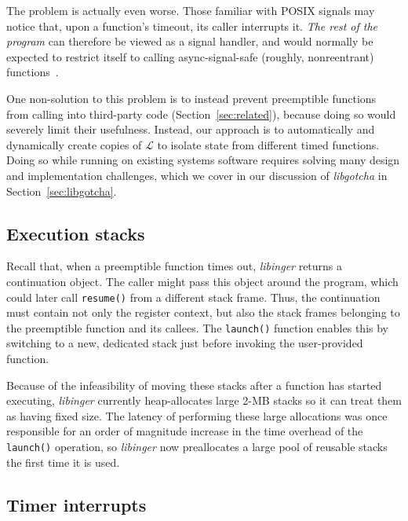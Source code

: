 The problem is actually even worse.  Those familiar with POSIX signals may notice
that, upon a function's timeout, its caller interrupts it.  \textit{The rest of the
program} can therefore be viewed as a signal handler, and would normally be expected
to restrict itself to calling async-signal-safe (roughly, nonreentrant)
functions~\cite{signal-safety-manpage}.

One non-solution to this problem is to instead prevent preemptible functions from
calling into third-party code (Section~\ref{sec:related}), because doing so would
severely limit their usefulness.  Instead, our approach
is to automatically and dynamically create copies of $\mathcal{L}$ to
isolate state from different timed functions. Doing so while running on
existing systems software requires solving many
design and implementation challenges, which we cover in our discussion of
\textit{libgotcha} in Section~\ref{sec:libgotcha}.



\subsection{Execution stacks}

Recall that, when a preemptible function times out, \textit{libinger} returns a
continuation object.  The caller might pass this object around the program, which
could later call \texttt{resume()} from a different stack frame.  Thus, the
continuation must contain not only the register context, but also the stack
frames belonging to the preemptible function and its callees.  The \texttt{launch()}
function enables this by switching to a new, dedicated stack just before invoking the
user-provided function.

Because of the infeasibility of moving these stacks after a function has started
executing, \textit{libinger} currently heap-allocates large 2-MB stacks so it can
treat them as having fixed size.  The latency of performing these large allocations
was once responsible for an order of magnitude increase in the time overhead of the
\texttt{launch()} operation, so \textit{libinger} now preallocates a large pool of
reusable stacks the first time it is used.


\subsection{Timer interrupts}

